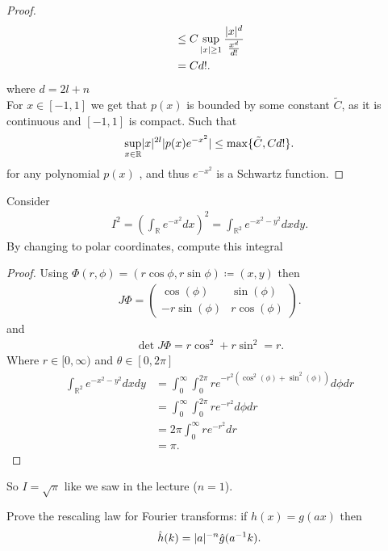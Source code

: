 \begin{proof}
\begin{align*}
                                                          &\le C\sup_{\lvert x\rvert\ge 1} \frac{\lvert x\rvert^{d} }{\frac{x^{d}}{d!} }\\
                                                          &=  C d!
.\end{align*}
where $d  = 2l+n$ \\
For $x \in  [-1,1]$ we get that $p(x)$ is bounded by some constant $\tilde{C} $, as it is continuous and $[-1,1]$ is compact.
Such that 
\begin{align*}
  \sup_{x \in  \mathbb{R}} \lvert x\rvert^{2l}\lvert p(x)e^{-x^2} \rvert \le \max\{\tilde{C},Cd! \}
.\end{align*}
for any polynomial $p(x)$ , and thus $e^{-x^2} $ is a Schwartz function.
\end{proof}
\begin{exercise}[b]
  Consider 
  \begin{align*}
    I^2= \left(\int_\mathbb{R} e^{-x^2} dx   \right)^2 =   \int_{\mathbb{R}^{2} } e^{-x^2-y^2} dx dy
  .\end{align*}
By changing to polar coordinates, compute this integral
\end{exercise}
\begin{proof}
 Using $\Phi(r,\phi ) = (r \cos \phi ,r \sin \phi ) \coloneqq (x,y)$  then 
 \begin{align*}
   J\Phi  = \begin{pmatrix} \cos(\phi ) & \sin(\phi ) \\ -r \sin(\phi ) &  r\cos(\phi )  \end{pmatrix} 
 .\end{align*}
 and 
 \begin{align*}
   \det{J\Phi } = r \cos^2 + r \sin^2 = r 
 .\end{align*}
 Where $r \in  [0,\infty)$ and $\theta \in [0,2\pi ]$
 \begin{align*}
   \int_{\mathbb{R}^{2}} e^{-x^2-y^2} dx dy &=  \int_0^{\infty} \int_0^{2\pi } r e^{-r^2(\cos^2(\phi) + \sin^2(\phi ))} d\phi dr \\
                                            &=\int_0^{\infty} \int_0^{2\pi}   r e^{-r^2} d\phi  dr \\
                                            &= 2\pi \int_0^{\infty}  r e^{-r^2} dr\\
                                            &= \pi 
 .\end{align*}
\end{proof}
So $I = \sqrt{\pi} $ like we saw in the lecture ($n=1$).
\begin{exercise}[c]
Prove the rescaling law for Fourier transforms:  if $h(x) = g(ax)$   then 
\begin{align*}
  \hat{h}(k)  = \lvert a\rvert^{-n} \hat{g}(a^{-1}k ) 
.\end{align*}
\end{exercise}
